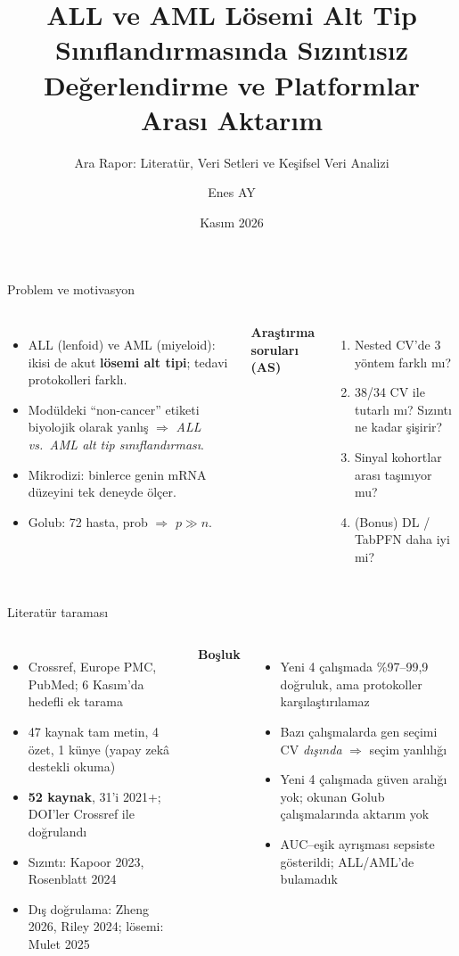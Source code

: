 \documentclass[aspectratio=169,11pt]{beamer}
\title{ALL ve AML Lösemi Alt Tip Sınıflandırmasında Sızıntısız Değerlendirme ve Platformlar Arası Aktarım}
\subtitle{Ara Rapor: Literatür, Veri Setleri ve Keşifsel Veri Analizi}
\author{Enes AY \quad 503020260092}
\institute{Eskişehir Osmangazi Üniversitesi, Fen Bilimleri Enstitüsü, Yapay Zeka Programı\\Makine Öğrenmesi ve Anomali Tespiti}
\date{Kasım 2026}
\begin{document}
\begin{frame}
\titlepage
\end{frame}

\begin{frame}{Problem ve motivasyon}
\begin{columns}[T]
\begin{itemize}
\item ALL (lenfoid) ve AML (miyeloid): ikisi de akut \textbf{lösemi alt tipi}; tedavi protokolleri farklı.
\item Modüldeki ``non-cancer'' etiketi biyolojik olarak yanlış $\Rightarrow$ \emph{ALL vs.\ AML alt tip sınıflandırması}.
\item Mikrodizi: binlerce genin mRNA düzeyini tek deneyde ölçer.
\item Golub: 72 hasta, \GolubP{} prob $\Rightarrow$ $p \gg n$.
\end{itemize}
\textbf{Araştırma soruları (AS)}
\begin{enumerate}\small
\item Nested CV'de 3 yöntem farklı mı?
\item 38/34 CV ile tutarlı mı? Sızıntı ne kadar şişirir?
\item Sinyal kohortlar arası taşınıyor mu?
\item (Bonus) DL / TabPFN daha iyi mi?
\end{enumerate}
\end{columns}
\end{frame}

\begin{frame}{Literatür taraması}
\begin{columns}[T]
\begin{itemize}\small
\item Crossref, Europe PMC, PubMed; 6 Kasım'da hedefli ek tarama
\item 47 kaynak tam metin, 4 özet, 1 künye (yapay zekâ destekli okuma)
\item \textbf{52 kaynak}, 31'i 2021+; DOI'ler Crossref ile doğrulandı
\item Sızıntı: Kapoor 2023, Rosenblatt 2024
\item Dış doğrulama: Zheng 2026, Riley 2024; lösemi: Mulet 2025
\end{itemize}
\textbf{Boşluk}
\begin{itemize}\small
\item Yeni 4 çalışmada \%97--99,9 doğruluk, ama protokoller karşılaştırılamaz
\item Bazı çalışmalarda gen seçimi CV \emph{dışında} $\Rightarrow$ seçim yanlılığı
\item Yeni 4 çalışmada güven aralığı yok; okunan Golub çalışmalarında aktarım yok
\item AUC--eşik ayrışması sepsiste gösterildi; ALL/AML'de bulamadık
\end{itemize}
\end{columns}
\end{frame}
\end{document}
